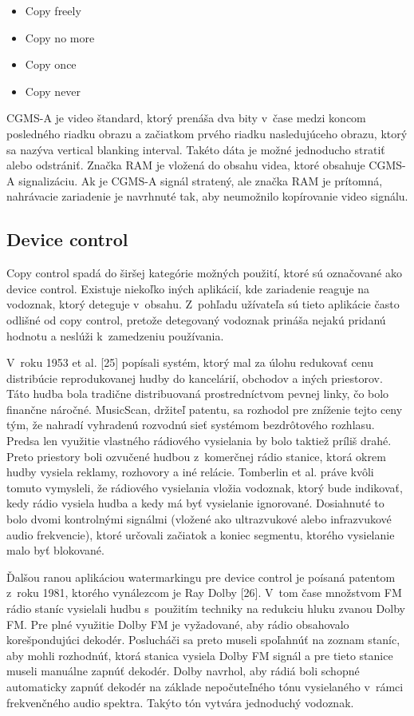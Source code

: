 \begin{itemize}
\item Copy freely
\item Copy no more
\item Copy once
\item Copy never
\end{itemize}

CGMS-A je video štandard, ktorý prenáša dva bity v~čase medzi koncom posledného riadku obrazu a začiatkom prvého riadku nasledujúceho obrazu, ktorý sa nazýva vertical blanking interval. Takéto dáta je možné jednoducho stratiť alebo odstrániť. Značka RAM je vložená do obsahu videa, ktoré obsahuje CGMS-A signalizáciu. Ak je CGMS-A signál stratený, ale značka RAM je prítomná, nahrávacie zariadenie je navrhnuté tak, aby neumožnilo kopírovanie video signálu. \cite{Cox}

\subsection{Device control}
Copy control spadá do širšej kategórie možných použití, ktoré sú označované ako device control. Existuje niekoľko iných aplikácií, kde zariadenie reaguje na vodoznak, ktorý deteguje v~obsahu. Z~pohľadu užívateľa sú tieto aplikácie často odlišné od copy control, pretože detegovaný vodoznak prináša nejakú pridanú hodnotu a neslúži k~zamedzeniu používania.

V~roku 1953 et al. [25] popísali systém, ktorý mal za úlohu redukovať cenu distribúcie reprodukovanej hudby do kancelárií, obchodov a iných priestorov. Táto hudba bola tradične distribuovaná prostredníctvom pevnej linky, čo bolo finančne náročné. MusicScan, držiteľ patentu, sa rozhodol pre zníženie tejto ceny tým, že nahradí vyhradenú rozvodnú sieť systémom bezdrôtového rozhlasu. Predsa len využitie vlastného rádiového vysielania by bolo taktiež príliš drahé. Preto priestory boli ozvučené hudbou z~komerčnej rádio stanice, ktorá okrem hudby vysiela reklamy, rozhovory a iné relácie. Tomberlin et al. práve kvôli tomuto vymysleli, že rádiového vysielania vložia vodoznak, ktorý bude indikovať, kedy rádio vysiela hudba a kedy má byť vysielanie ignorované. Dosiahnuté to bolo dvomi kontrolnými signálmi (vložené ako ultrazvukové alebo infrazvukové audio frekvencie), ktoré určovali začiatok a koniec segmentu, ktorého vysielanie malo byť blokované.

Ďalšou ranou aplikáciou watermarkingu pre device control je poísaná patentom z~roku 1981, ktorého vynálezcom je Ray Dolby [26]. V~tom čase množstvom FM rádio staníc vysielali hudbu s~použitím techniky na redukciu hluku zvanou Dolby FM. Pre plné využitie Dolby FM je vyžadované, aby rádio obsahovalo korešpondujúci dekodér. Poslucháči sa preto museli spoľahnúť na zoznam staníc, aby mohli rozhodnúť, ktorá stanica vysiela Dolby FM signál a pre tieto stanice museli manuálne zapnúť dekodér. Dolby navrhol, aby rádiá boli schopné automaticky zapnúť dekodér na základe nepočuteľného tónu vysielaného v~rámci frekvenčného audio spektra. Takýto tón vytvára jednoduchý vodoznak.


